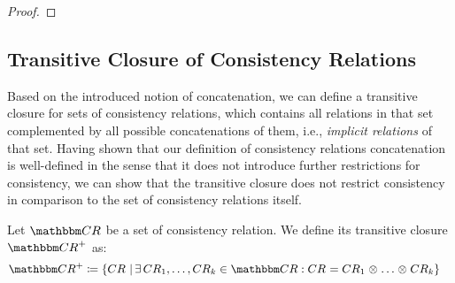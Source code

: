\begin{proof}
\end{proof}



\subsection{Transitive Closure of Consistency Relations}

Based on the introduced notion of concatenation, we can define a transitive closure for sets of consistency relations, which contains all relations in that set complemented by all possible concatenations of them, i.e., \emph{implicit relations} of that set.
Having shown that our definition of consistency relations concatenation is well-defined in the sense that it does not introduce further restrictions for consistency, we can show that the transitive closure does not restrict consistency in comparison to the set of consistency relations itself.

\begin{definition} \label{def:transitiveclosure}
    Let $\consistencyrelationset{CR}$ be a set of consistency relation. We define its transitive closure $\transitiveclosure{\consistencyrelationset{CR}}$ as:
    \begin{align*}
        \transitiveclosure{\consistencyrelationset{CR}{}} \equalsperdefinition \setted{\consistencyrelation{CR}{} \mid & \exists \consistencyrelation{CR}{1}, \dots, \consistencyrelation{CR}{k} \in \consistencyrelationset{CR}{} : %
        \consistencyrelation{CR}{} = \consistencyrelation{CR}{1} \concat \dots \concat \consistencyrelation{CR}{k} }
    \end{align*}
\end{definition}


